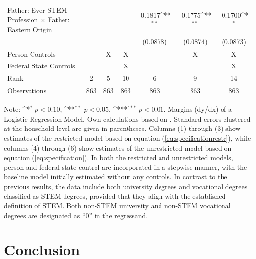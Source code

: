 \documentclass[a4paper, oneside, hyperfootnotes = false]{article}
\def\sym#1{\ifmmode^{#1}\else\(^{#1}\)\fi}
\begin{document}
{\begin{landscape}
\begin{table}[ht]
\begin{center}
{\begin{tabular}{l*{6}{c}}
					\addlinespace
					Father: Ever STEM Profession $\times$ Father: Eastern Origin&                     &                     &                     &     -0.1817\sym{**} &     -0.1775\sym{**} &     -0.1700\sym{*}  \\
					&                     &                     &                     &    (0.0878)         &    (0.0874)         &    (0.0873)         \\
					\midrule
					Person Controls & & X  & X & & X & X \\
					Federal State Controls & & & X & & & X \\
					Rank                &      2         &      5         &     10         &      6         &      9         &     14         \\
					Observations &    863         &    863         &    863         &    863         &    863         &    863         \\
					\bottomrule
			\end{tabular}}
			
			\vspace{2mm}
			
			\parbox{15cm}{
				\linespread{1}\footnotesize Note: \sym{*} \(p<0.10\), \sym{**} \(p<0.05\), \sym{***} \(p<0.01\). Margins (dy/dx) of a Logistic Regression Model. Own calculations based on \cite{SOEP2023}. Standard errors clustered at the household level are given in parentheses. Columns (1) through (3) show estimates of the restricted model based on equation (\ref{eq:specificationrestr}), while columns (4) through (6) show estimates of the unrestricted model based on equation (\ref{eq:specification}). In both the restricted and unrestricted models, person and federal state control are incorporated in a stepwise manner, with the baseline model initially estimated without any controls. In contrast to the previous results, the data include both university degrees and vocational degrees classified as STEM degrees, provided that they align with the established definition of STEM. Both non-STEM university and non-STEM vocational degrees are designated as ``0'' in the regressand.}
			
		\end{center}
	\end{table}
\end{landscape}

\clearpage

\section{Conclusion}
\label{conclusion}

}
\end{document}
